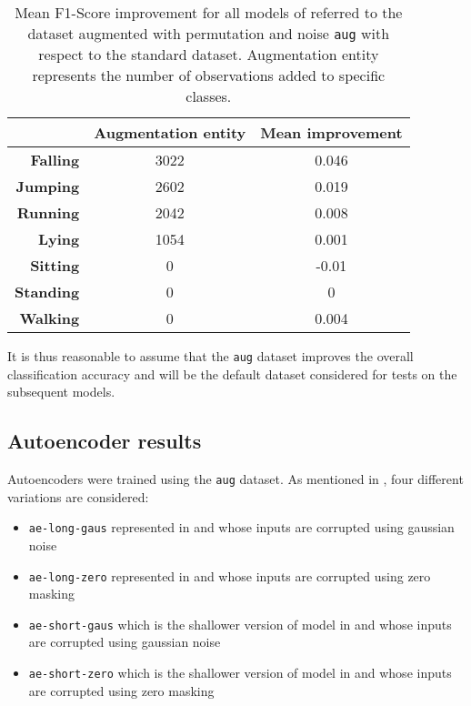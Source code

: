 \begin{table}[!htbp]
\footnotesize
\captionsetup{font=scriptsize, justification=centering}
\centering
\begin{tabular}{|r|c|c|}
\hline
 & \textbf{Augmentation entity} & \textbf{Mean improvement} \\ \hline
\textbf{Falling} & 3022 & 0.046 \\ \hline
\textbf{Jumping} & 2602 & 0.019 \\ \hline
\textbf{Running} & 2042 & 0.008 \\ \hline
\textbf{Lying} & 1054 & 0.001 \\ \hline
\textbf{Sitting} & 0 & -0.01 \\ \hline
\textbf{Standing} & 0 & 0 \\ \hline
\textbf{Walking} & 0 & 0.004 \\ \hline
\end{tabular}
\caption{Mean F1-Score improvement for all models of  referred to the dataset augmented with permutation and noise \texttt{aug} with respect to the standard dataset. Augmentation entity represents the number of observations added to specific classes.}
\label{datasets_improvement_table}
\end{table}

It is thus reasonable to assume that the \texttt{aug} dataset improves the overall classification accuracy and will be the default dataset considered for tests on the subsequent models.

\subsection{Autoencoder results}
\label{sec:autoencoder_results}
Autoencoders were trained using the \texttt{aug} dataset. As mentioned in , four different variations are considered:
\begin{itemize}
\item \texttt{ae-long-gaus} represented in  and whose inputs are corrupted using gaussian noise
\item \texttt{ae-long-zero} represented in  and whose inputs are corrupted using zero masking
\item \texttt{ae-short-gaus} which is the shallower version of model in  and whose inputs are corrupted using gaussian noise
\item \texttt{ae-short-zero} which is the shallower version of model in  and whose inputs are corrupted using zero masking
\end{itemize}

